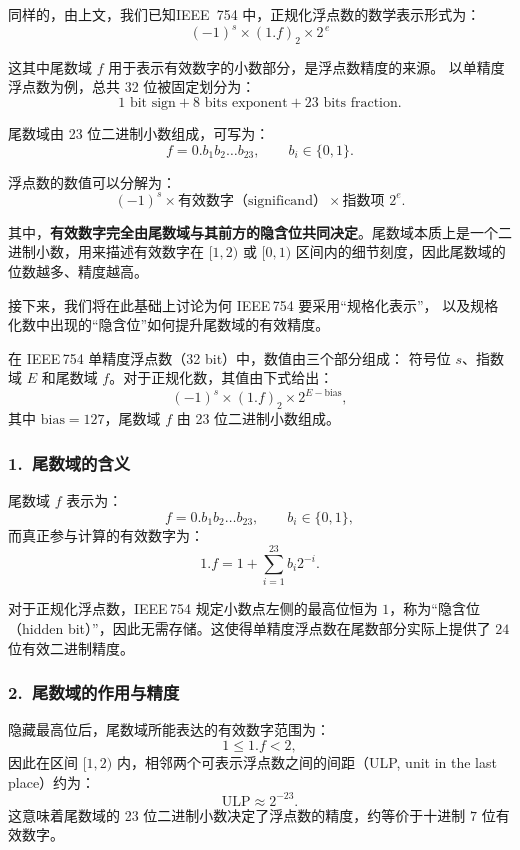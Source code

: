 同样的，由上文，我们已知IEEE~754 中，正规化浮点数的数学表示形式为：
\[
(-1)^s \times (1.f)_2 \times 2^{\,e}
\]


  这其中尾数域 $f$ 用于表示有效数字的小数部分，是浮点数精度的来源。
以单精度浮点数为例，总共 32 位被固定划分为：
\[
1\text{ bit sign} + 8\text{ bits exponent} + 23\text{ bits fraction}.
\]

尾数域由 23 位二进制小数组成，可写为：
\[
f = 0.b_1 b_2 \ldots b_{23}, \qquad b_i\in\{0,1\}.
\]

浮点数的数值可以分解为：
\[
(-1)^s \times \text{有效数字（significand）} \times \text{指数项 } 2^e.
\]

其中，\textbf{有效数字完全由尾数域与其前方的隐含位共同决定}。尾数域本质上是一个二进制小数，用来描述有效数字在 $[1,2)$ 或 $[0,1)$ 区间内的细节刻度，因此尾数域的位数越多、精度越高。

接下来，我们将在此基础上讨论为何 IEEE\,754 要采用“规格化表示”，
以及规格化数中出现的“隐含位”如何提升尾数域的有效精度。
























在 IEEE\,754 单精度浮点数（32 bit）中，数值由三个部分组成：
符号位 $s$、指数域 $E$ 和尾数域 $f$。对于正规化数，其值由下式给出：
\[
(-1)^s \times (1.f)_2 \times 2^{E-\mathrm{bias}},
\]
其中 $\mathrm{bias}=127$，尾数域 $f$ 由 23 位二进制小数组成。

\subsubsection*{1.\ 尾数域的含义}
尾数域 $f$ 表示为：
\[
f = 0.b_1 b_2 \dots b_{23},
\qquad b_i \in \{0,1\},
\]
而真正参与计算的有效数字为：
\[
1.f = 1 + \sum_{i=1}^{23} b_i 2^{-i}.
\]

对于正规化浮点数，IEEE\,754 规定小数点左侧的最高位恒为 $1$，称为“隐含位（hidden bit）”，因此无需存储。这使得单精度浮点数在尾数部分实际上提供了 $24$ 位有效二进制精度。

\subsubsection*{2.\ 尾数域的作用与精度}
隐藏最高位后，尾数域所能表达的有效数字范围为：
\[
1 \le 1.f < 2,
\]
因此在区间 $[1,2)$ 内，相邻两个可表示浮点数之间的间距（ULP, unit in the last place）约为：
\[
\mathrm{ULP} \approx 2^{-23}.
\]
这意味着尾数域的 23 位二进制小数决定了浮点数的精度，约等价于十进制 $7$ 位有效数字。

